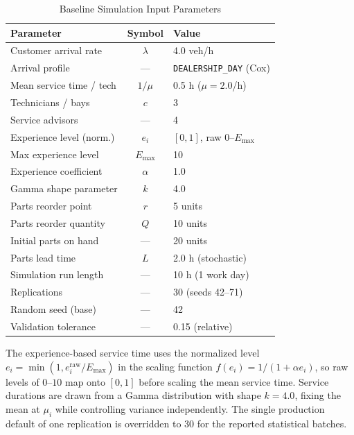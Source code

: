 \documentclass[conference]{IEEEtran}
\begin{document}
\begin{table}[h]
\centering
\caption{Baseline Simulation Input Parameters}
\label{tab:params}
\renewcommand{\arraystretch}{1.2}
\begin{tabular}{@{}p{3.1cm}cp{2.6cm}@{}}
\toprule
\textbf{Parameter} & \textbf{Symbol} & \textbf{Value} \\
\midrule
Customer arrival rate & $\lambda$ & 4.0 veh/h \\
Arrival profile & --- & \texttt{DEALERSHIP\_DAY} (Cox) \\
Mean service time / tech & $1/\mu$ & 0.5 h ($\mu = 2.0$/h) \\
Technicians / bays & $c$ & 3 \\
Service advisors & --- & 4 \\
Experience level (norm.) & $e_i$ & $[0,1]$, raw $0$--$E_{\max}$ \\
Max experience level & $E_{\max}$ & 10 \\
Experience coefficient & $\alpha$ & 1.0 \\
Gamma shape parameter & $k$ & 4.0 \\
Parts reorder point & $r$ & 5 units \\
Parts reorder quantity & $Q$ & 10 units \\
Initial parts on hand & --- & 20 units \\
Parts lead time & $L$ & 2.0 h (stochastic) \\
Simulation run length & --- & 10 h (1 work day) \\
Replications & --- & 30 (seeds 42--71) \\
Random seed (base) & --- & 42 \\
Validation tolerance & --- & 0.15 (relative) \\
\bottomrule
\end{tabular}
\end{table}

The experience-based service time uses the normalized level
$e_i = \min(1, e_i^{\text{raw}} / E_{\max})$ in the scaling function
$f(e_i) = 1 / (1 + \alpha e_i)$, so raw levels of $0$--$10$ map onto $[0,1]$
before scaling the mean service time. Service durations are drawn from a Gamma
distribution with shape $k = 4.0$, fixing the mean at $\mu_i$ while controlling
variance independently. The single production default of one replication is
overridden to 30 for the reported statistical batches.

\end{document}
